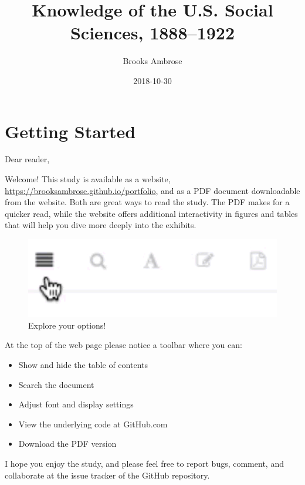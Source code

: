 \documentclass[]{book}
\title{Knowledge of the U.S. Social Sciences, 1888--1922}
\author{Brooks Ambrose}
\date{2018-10-30}
\providecommand{\tightlist}{%
  \setlength{\itemsep}{0pt}\setlength{\parskip}{0pt}}
\begin{document}
\maketitle

{
\setcounter{tocdepth}{2}
\tableofcontents
}
\listoftables
\listoffigures
\chapter*{Getting Started}\label{getting-started}


Dear reader,

Welcome! This study is available as a website,
\url{https://brooksambrose.github.io/portfolio}, and as a PDF document
downloadable from the website. Both are great ways to read the study.
The PDF makes for a quicker read, while the website offers additional
interactivity in figures and tables that will help you dive more deeply
into the exhibits.

\begin{figure}

{\centering \includegraphics{img/toolbar} 

}

\caption{Explore your options!}\label{fig:toolbar}
\end{figure}

At the top of the web page please notice a toolbar where you can:

\begin{itemize}
\tightlist
\item
  Show and hide the table of contents
\item
  Search the document
\item
  Adjust font and display settings
\item
  View the underlying code at GitHub.com
\item
  Download the PDF version
\end{itemize}

I hope you enjoy the study, and please feel free to report bugs,
comment, and collaborate at the issue tracker of the GitHub repository.
\end{document}
